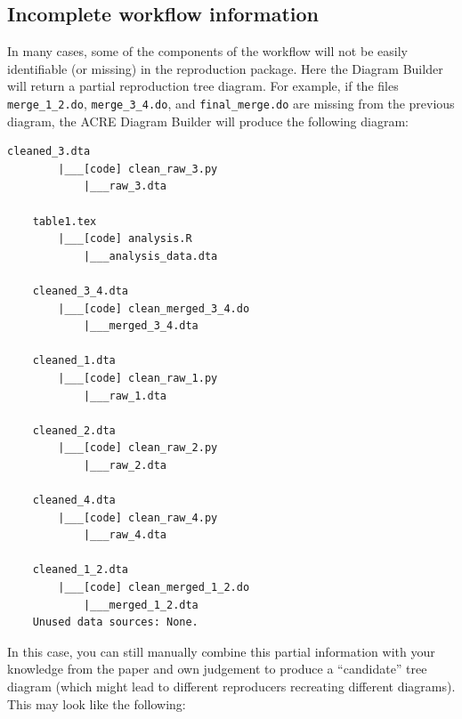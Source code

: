 \documentclass[]{book}
\begin{document}
\hypertarget{incomplete-workflow-information}{%
\subsection{Incomplete workflow information}\label{incomplete-workflow-information}}

In many cases, some of the components of the workflow will not be easily identifiable (or missing) in the reproduction package. Here the Diagram Builder will return a partial reproduction tree diagram. For example, if the files \texttt{merge\_1\_2.do}, \texttt{merge\_3\_4.do}, and \texttt{final\_merge.do} are missing from the previous diagram, the ACRE Diagram Builder will produce the following diagram:

\begin{verbatim}
cleaned_3.dta
        |___[code] clean_raw_3.py
            |___raw_3.dta

    table1.tex
        |___[code] analysis.R
            |___analysis_data.dta

    cleaned_3_4.dta
        |___[code] clean_merged_3_4.do
            |___merged_3_4.dta

    cleaned_1.dta
        |___[code] clean_raw_1.py
            |___raw_1.dta

    cleaned_2.dta
        |___[code] clean_raw_2.py
            |___raw_2.dta

    cleaned_4.dta
        |___[code] clean_raw_4.py
            |___raw_4.dta

    cleaned_1_2.dta
        |___[code] clean_merged_1_2.do
            |___merged_1_2.dta
    Unused data sources: None.
\end{verbatim}

In this case, you can still manually combine this partial information with your knowledge from the paper and own judgement to produce a ``candidate'' tree diagram (which might lead to different reproducers recreating different diagrams). This may look like the following:
\end{document}
